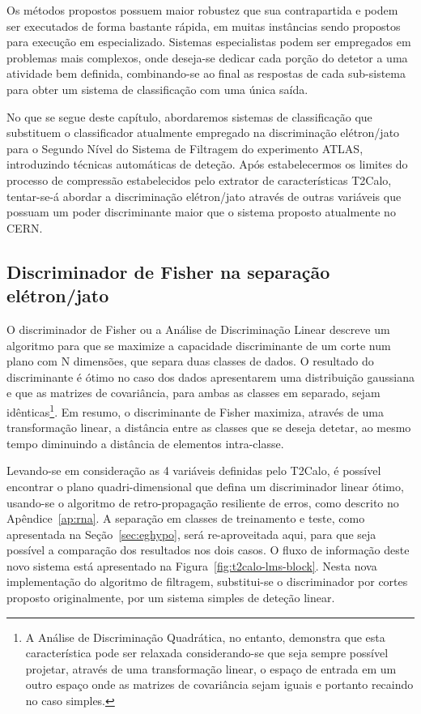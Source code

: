 Os métodos propostos possuem maior robustez que sua contrapartida e podem ser
executados de forma bastante rápida, em muitas instâncias sendo propostos para
execução em  especializado. Sistemas especialistas podem ser
empregados em problemas mais complexos, onde deseja-se dedicar cada porção do
detetor a uma atividade bem definida, combinando-se ao final as respostas de
cada sub-sistema para obter um sistema de classificação com uma única saída.

No que se segue deste capítulo, abordaremos sistemas de classificação que
substituem o classificador atualmente empregado na discriminação elétron/jato
para o Segundo Nível do Sistema de Filtragem do experimento ATLAS,
introduzindo técnicas automáticas de deteção. Após estabelecermos os limites
do processo de compressão estabelecidos pelo extrator de características
T2Calo, tentar-se-á abordar a discriminação elétron/jato através de outras
variáveis que possuam um poder discriminante maior que o sistema proposto
atualmente no CERN.

\subsection{Discriminador de Fisher na separação e\-lé\-tron/jato}
\label{sec:linear}

O discriminador de Fisher \cite{fisher} ou a Análise de Discriminação Linear
descreve um algoritmo para que se maximize a capacidade discriminante de um
corte num plano com N dimensões, que separa duas classes de dados. O resultado
do discriminante é ótimo no caso dos dados apresentarem uma distribuição
gaussiana e que as matrizes de covariância, para ambas as classes em separado,
sejam idênticas\footnote{A Análise de Discriminação Quadrática, no entanto,
demonstra que esta característica pode ser relaxada considerando-se que seja
sempre possível projetar, através de uma transformação linear, o espaço de
entrada em um outro espaço onde as matrizes de covariância sejam iguais e
portanto recaindo no caso simples.}. Em resumo, o discriminante de Fisher
maximiza, através de uma transformação linear, a distância entre as classes
que se deseja detetar, ao mesmo tempo diminuindo a distância de elementos
intra-classe.

Levando-se em consideração as 4 variáveis definidas pelo T2Calo, é possível
encontrar o plano quadri-dimensional que defina um discriminador linear ótimo,
usando-se o algoritmo de retro-propagação resiliente de erros, como descrito
no Apêndice~\ref{ap:rna}. A separação em classes de treinamento e teste, como
apresentada na Seção~\ref{sec:eghypo}, será re-aproveitada aqui, para que seja
possível a comparação dos resultados nos dois casos. O fluxo de informação
deste novo sistema está apresentado na
Figura~\ref{fig:t2calo-lms-block}. Nesta nova implementação do algoritmo de
filtragem, substitui-se o discriminador por cortes proposto originalmente, por
um sistema simples de deteção linear.

